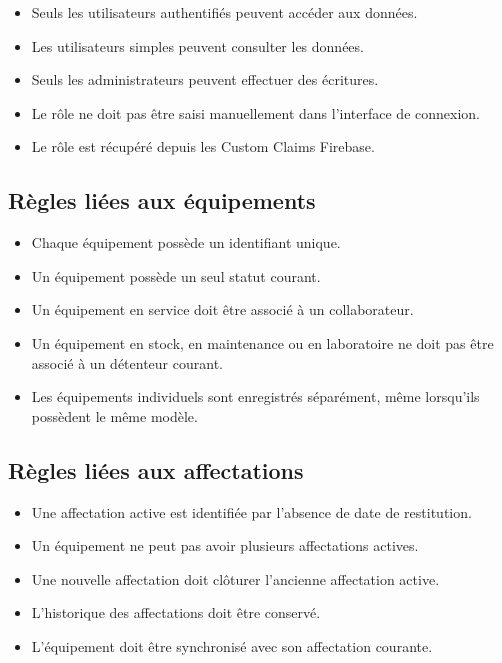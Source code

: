\documentclass{rapportENSIAS}
\begin{document}
\begin{itemize}
\item Seuls les utilisateurs authentifiés peuvent accéder aux données.
\item Les utilisateurs simples peuvent consulter les données.
\item Seuls les administrateurs peuvent effectuer des écritures.
\item Le rôle ne doit pas être saisi manuellement dans l’interface de connexion.
\item Le rôle est récupéré depuis les Custom Claims Firebase.
\end{itemize}

\subsection{Règles liées aux équipements}

\begin{itemize}
\item Chaque équipement possède un identifiant unique.
\item Un équipement possède un seul statut courant.
\item Un équipement en service doit être associé à un collaborateur.
\item Un équipement en stock, en maintenance ou en laboratoire ne doit pas être associé à un détenteur courant.
\item Les équipements individuels sont enregistrés séparément, même lorsqu’ils possèdent le même modèle.
\end{itemize}

\subsection{Règles liées aux affectations}

\begin{itemize}
\item Une affectation active est identifiée par l’absence de date de restitution.
\item Un équipement ne peut pas avoir plusieurs affectations actives.
\item Une nouvelle affectation doit clôturer l’ancienne affectation active.
\item L’historique des affectations doit être conservé.
\item L’équipement doit être synchronisé avec son affectation courante.
\end{itemize}
\end{document}
